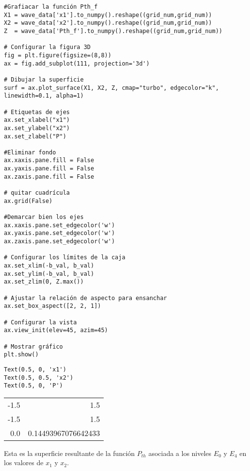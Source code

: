 \documentclass[11pt]{article}
\begin{document}
\begin{verbatim}
#Grafiacar la función Pth_f
X1 = wave_data['x1'].to_numpy().reshape((grid_num,grid_num))
X2 = wave_data['x2'].to_numpy().reshape((grid_num,grid_num))
Z  = wave_data['Pth_f'].to_numpy().reshape((grid_num,grid_num))

# Configurar la figura 3D
fig = plt.figure(figsize=(8,8))
ax = fig.add_subplot(111, projection='3d')

# Dibujar la superficie
surf = ax.plot_surface(X1, X2, Z, cmap="turbo", edgecolor="k", linewidth=0.1, alpha=1)

# Etiquetas de ejes
ax.set_xlabel("x1")
ax.set_ylabel("x2")
ax.set_zlabel("P")

#Eliminar fondo
ax.xaxis.pane.fill = False
ax.yaxis.pane.fill = False
ax.zaxis.pane.fill = False

# quitar cuadrícula
ax.grid(False)

#Demarcar bien los ejes
ax.xaxis.pane.set_edgecolor('w')
ax.yaxis.pane.set_edgecolor('w')
ax.zaxis.pane.set_edgecolor('w')

# Configurar los límites de la caja
ax.set_xlim(-b_val, b_val)
ax.set_ylim(-b_val, b_val)
ax.set_zlim(0, Z.max())

# Ajustar la relación de aspecto para ensanchar
ax.set_box_aspect([2, 2, 1])

# Configurar la vista
ax.view_init(elev=45, azim=45)

# Mostrar gráfico
plt.show()
\end{verbatim}

\label{org85fee94}
\begin{verbatim}
Text(0.5, 0, 'x1')
Text(0.5, 0.5, 'x2')
Text(0.5, 0, 'P')
\end{verbatim}

\begin{center}
\begin{tabular}{rr}
-1.5 & 1.5\\
-1.5 & 1.5\\
0.0 & 0.14493967076642433\\
\end{tabular}
\end{center}
\begin{center}

\end{center}

Esta es la superficie resultante de la función \(P_{th}\) asociada a los niveles
\(E_0\) y \(E_4\) en los valores de \(x_1\) y \(x_2\).
\end{document}
